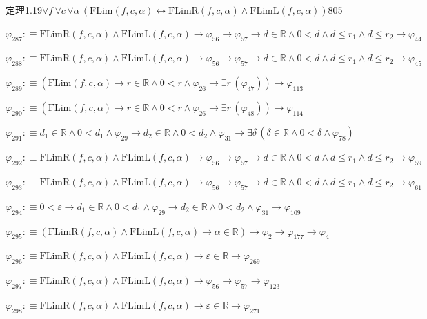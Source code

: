 \begin{fullproof}{定理1.19}{$\forall f\,\forall c\,\forall \alpha\,(\mathrm{FLim}(f,c,\alpha) \leftrightarrow \mathrm{FLimR}(f,c,\alpha) \land \mathrm{FLimL}(f,c,\alpha))$}{805}
\begin{abbrevlist}
\item $\varphi_{287} :\equiv \mathrm{FLimR}(f,c,\alpha) \land \mathrm{FLimL}(f,c,\alpha) \to \varphi_{56} \to \varphi_{57} \to d \in \mathbb{R} \land 0 < d \land d \leq r_{1} \land d \leq r_{2} \to \varphi_{44}$
\item $\varphi_{288} :\equiv \mathrm{FLimR}(f,c,\alpha) \land \mathrm{FLimL}(f,c,\alpha) \to \varphi_{56} \to \varphi_{57} \to d \in \mathbb{R} \land 0 < d \land d \leq r_{1} \land d \leq r_{2} \to \varphi_{45}$
\item $\varphi_{289} :\equiv (\mathrm{FLim}(f,c,\alpha) \to r \in \mathbb{R} \land 0 < r \land \varphi_{26} \to \exists r\,(\varphi_{47})) \to \varphi_{113}$
\item $\varphi_{290} :\equiv (\mathrm{FLim}(f,c,\alpha) \to r \in \mathbb{R} \land 0 < r \land \varphi_{26} \to \exists r\,(\varphi_{48})) \to \varphi_{114}$
\item $\varphi_{291} :\equiv d_{1} \in \mathbb{R} \land 0 < d_{1} \land \varphi_{29} \to d_{2} \in \mathbb{R} \land 0 < d_{2} \land \varphi_{31} \to \exists \delta\,(\delta \in \mathbb{R} \land 0 < \delta \land \varphi_{78})$
\item $\varphi_{292} :\equiv \mathrm{FLimR}(f,c,\alpha) \land \mathrm{FLimL}(f,c,\alpha) \to \varphi_{56} \to \varphi_{57} \to d \in \mathbb{R} \land 0 < d \land d \leq r_{1} \land d \leq r_{2} \to \varphi_{59}$
\item $\varphi_{293} :\equiv \mathrm{FLimR}(f,c,\alpha) \land \mathrm{FLimL}(f,c,\alpha) \to \varphi_{56} \to \varphi_{57} \to d \in \mathbb{R} \land 0 < d \land d \leq r_{1} \land d \leq r_{2} \to \varphi_{61}$
\item $\varphi_{294} :\equiv 0 < \varepsilon \to d_{1} \in \mathbb{R} \land 0 < d_{1} \land \varphi_{29} \to d_{2} \in \mathbb{R} \land 0 < d_{2} \land \varphi_{31} \to \varphi_{109}$
\item $\varphi_{295} :\equiv (\mathrm{FLimR}(f,c,\alpha) \land \mathrm{FLimL}(f,c,\alpha) \to \alpha \in \mathbb{R}) \to \varphi_{2} \to \varphi_{177} \to \varphi_{4}$
\item $\varphi_{296} :\equiv \mathrm{FLimR}(f,c,\alpha) \land \mathrm{FLimL}(f,c,\alpha) \to \varepsilon \in \mathbb{R} \to \varphi_{269}$
\item $\varphi_{297} :\equiv \mathrm{FLimR}(f,c,\alpha) \land \mathrm{FLimL}(f,c,\alpha) \to \varphi_{56} \to \varphi_{57} \to \varphi_{123}$
\item $\varphi_{298} :\equiv \mathrm{FLimR}(f,c,\alpha) \land \mathrm{FLimL}(f,c,\alpha) \to \varepsilon \in \mathbb{R} \to \varphi_{271}$

\end{abbrevlist}
\end{fullproof}
